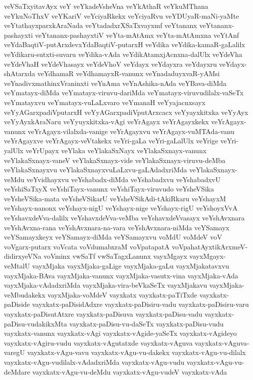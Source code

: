 {veVSaTxyitavAyx
veY
veYkadeVsheVna
veYkAthaR
veYkuMThana
veYkuNoThxV
veYKariV
veYciyaRkekx
veYciyaRvu
veYDUyaR-maNi-yaMte
veYtathayxparxkAraNada
veYtadadxrXSaTxvayxmf
veYtananx
veYtananx-pashayxti
veYtananx-pashayxtiV
veYta-mAtAmx
veYta-mAtAmxna
veYtAnf
veYdaBaqtiV-putArxdevxYdaBaqtiV-putarxH
veYdika
veYdika-kamaR-gaLalilx
veYdikaru-sutxti-suvaru
veYdika-vAda
veYdikAtamxjAcnxna-dalUlx
veYdeVha
veYdeVhaH
veYdeVhasayx
veYdeVhoV
veYdayx
veYdayxra
veYdayxru
veYdayx-shAtarxda
veYdhamaR
veYdhamayxR-vanunx
veYnadaduyxvaR-yAMsi
veYnadivxmathinxVraninxti
veYnAma
veYnAshika-nAda
veYBava-diMda
veYmatayx-diMda
veYmatayx-viruvu-dariMda
veYmatayx-viruvudilalx-vaSeTx
veYmatayxvu
veYmatayx-vuLaLxvaro
veYmanaH
veYyajacnxsayx
veYyAGarxpadiVputarxH
veYyAGarxpadiVputArxcacx
veYyayxkitxka
veYyAyx
veYyAyxkAraNaru
veYyuyxkitxka-vAgi
veYrAgayx
veYrAgayxkekx
veYrAgayx-vanunx
veYrAgayx-vilalxda-vanige
veYrAgayxvu
veYrAgayx-vuMTAda-vanu
veYrAgayxve
veYrAgayx-veVtakekx
veYri-gaLa
veYri-gaLalUlx
veYrige
veYri-yalUlx
veYrUpayx
veYlaka
veYlakaSxNayx
veYlakaSxnayx-vanunx
veYlakaSxnayx-vaneV
veYlakaSxnayx-vide
veYlakaSxnayx-viruvu-deMba
veYlakaSxnayxvu
veYlakaSxnayxvuLaLxvu-gaLAdadxriMda
veYlakaSxnayx-veMdu
veYvidhayxvu
veYshabadx-diMda
veYshabadxvu
veYshabadxvU
veYshiSaTxyX
veYshiTayx-vanunx
veYshiTayx-viruvudo
veYsheVSika
veYsheVSika-mata
veYsheVSikarU
veYsheVSikAdi-tAkiRkaru
veYshayxM
veYshayx-nanonx
veYshayx-nigU
veYshayx-nige
veYshayx-rigU
veYshoyxVvA
veYshavxdeVva-dalilx
veYshavxdeVva-veMba
veYshavxdeVvasayx
veYshAvxnara
veYshAvxna-rana
veYshAvxnara-na-vara
veYshAvxnara-niMda
veYSamayx
veYSamayxkeyx
veYSamayx-diMda
veYSamayxvu
voMdU
voMdeV
voV
voVgarx-putarx
voVcata
voVdumabxraM
voVpatapatA
voVpahatAyxtikArxmeV-didirxyeVNa
voVminx
vwSaTf
vwSaTagxLanunx
vayxMgayx
vayxMgayx-veMtalU
vayxMjaka
vayxMjaka-gaLige
vayxMjaka-gaLu
vayxMjakatavxvu
vayxMjaka-BAva
vayxMjaka-vanunx
vayxMjaka-vasutx-vina
vayxMjaka-vAda
vayxMjaka-vAdadxriMda
vayxMjaka-vira-beVkaSeTx
vayxMjakavu
vayxMjaka-veMbudakekx
vayxMjaka-voMdeV
vayxkatx
vayxkatx-paTiTxde
vayxkatx-paDiside
vayxkatx-paDisidAdxre
vayxkatx-paDisiru-vadu
vayxkatx-paDisiru-varu
vayxkatx-paDisutAtxre
vayxkatx-paDisuva
vayxkatx-paDisu-vadu
vayxkatx-paDisu-vudakikxMta
vayxkatx-paDisu-vu-daSeTx
vayxkatx-paDisu-vudu
vayxkatx-vanunx
vayxkatx-vAgi
vayxkatx-vAgide-yaSeTx
vayxkatx-vAgideyo
vayxkatx-vAgiru-vudu
vayxkatx-vAgutatxde
vayxkatx-vAguva
vayxkatx-vAguva-varegU
vayxkatx-vAgu-vavu
vayxkatx-vAgu-vu-dakekx
vayxkatx-vAgu-vu-dilalx
vayxkatx-vAgu-vudilalx-vAdadxriMda
vayxkatx-vAgu-vudu
vayxkatx-vAgu-vu-deMdare
vayxkatx-vAgu-vu-deMdu
vayxkatx-vAgu-vudeV
vayxkatx-vAda
}
